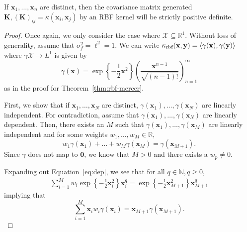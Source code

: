 \begin{lemma}
    \label{lem:rbf-pd}
    If $\mathbf{x}_1, \dots, \mathbf{x}_n$ are distinct, then the covariance matrix generated $\mathbf{K}, (\mathbf{K})_{ij} = \kappa(\mathbf{x}_i, \mathbf{x}_j)$ by an RBF kernel will be strictly positive definite.
\end{lemma}
\begin{proof}
    Once again, we only consider the case where $\mathcal{X} \subseteq \mathbb{R}^{1}$.
    Without loss of generality, assume that $\sigma_f^2 = \ell^2 = 1$.
    We can write $\kappa_{\text{rbf}}(\mathbf{x}, \mathbf{y}) = \langle \gamma(\mathbf{x}), \gamma(\mathbf{y}) \rangle$
    where $\gamma \mathcal{X} \to L^{1}$ is given by
    \begin{equation*}
        \gamma(\mathbf{x}) = \exp\left\{-\frac12 \mathbf{x}^2 \right\} \left(\frac{ \mathbf{x}^{n - 1} }{ \sqrt{(n - 1)!} }\right)_{n=1}^{\infty}
    \end{equation*}
    as in the proof for Theorem~\ref{thm:rbf-mercer}.

    First, we show that if $\mathbf{x}_1, \dots, \mathbf{x}_N$ are distinct, $\gamma(\mathbf{x}_1), \dots, \gamma(\mathbf{x}_N)$ are linearly independent.
    For contradiction, assume that $\gamma(\mathbf{x}_1), \dots, \gamma(\mathbf{x}_N)$ are linearly dependent.
    Then, there exists an $M$ such that $\gamma(\mathbf{x}_1), \dots, \gamma(\mathbf{x}_M)$
    are linearly independent and for some weights $w_1, \dots, w_M \in \mathbb{R}$,
    \begin{equation}
        \label{eq:dep}
        w_1 \gamma(\mathbf{x}_1) + \dots + w_M \gamma(\mathbf{x}_M) = \gamma(\mathbf{x}_{M + 1}).
    \end{equation}
    Since $\gamma$ does not map to $\mathbf{0}$, we know that $M > 0$ and there exists a $w_p \neq 0$.

    Expanding out Equation~\ref{eq:dep}, we see that for all $q \in \mathbb{N}, q \geq 0$,
    \begin{align*}
        \sum\limits_{i = 1}^{M} w_i \exp \left\{ -\frac12 \mathbf{x}_i^2 \right\} \mathbf{x}_i^{q}
        = \exp \left\{ -\frac12 \mathbf{x}_{M + 1}^2 \right\} \mathbf{x}_{M+1}^{q}
    \end{align*}
    implying that
    \begin{equation*}
        \sum\limits_{i=1}^{M} \mathbf{x}_i w_i \gamma(\mathbf{x}_i)  = \mathbf{x}_{M + 1} \gamma(\mathbf{x}_{M + 1}).
    \end{equation*}


\end{proof}
